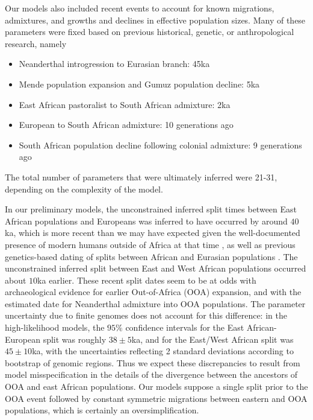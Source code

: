 \documentclass[]{article}
\begin{document}
Our models also included recent events to account for known migrations,
admixtures, and growths and declines in effective population sizes. Many of
these parameters were fixed based on previous historical, genetic, or
anthropological research, namely
\begin{itemize}
    \item Neanderthal introgression to Eurasian branch: 45ka
    \item Mende population expansion and Gumuz population decline: 5ka \citep{Gopalan2022-pw}
    \item East African pastoralist to South African admixture: 2ka \citep{Uren2016-nn}
    \item European to South African admixture: 10 generations ago
    \item South African population decline following colonial admixture: 9 generations ago
\end{itemize}
The total number of parameters that were
ultimately inferred were 21-31, depending on the complexity
of the model.

In our preliminary models, the unconstrained inferred split times between East
African populations and Europeans was inferred to have occurred by around
$40$ka, which is more recent than we may have expected given the
well-documented presence of modern humans outside of Africa at that time
\citep[e.g.]{Hublin2020-nk,Hajdinjak2021-jo}, as well as previous
genetics-based dating of splits between African and Eurasian populations
\citep[e.g.]{Jouganous2017-pq,Kamm2020-vn}. The unconstrained inferred split
between East and West African populations occurred about $10$ka earlier. These
recent split dates seem to be at odds with archaeological evidence for earlier
Out-of-Africa (OOA) expansion, and with the estimated date for Neanderthal
admixture into OOA populations. The parameter uncertainty due to finite genomes
does not account for this difference: in the high-likelihood models, the $95\%$
confidence intervals for the East African-European split was roughly $38 \pm
5$ka, and for the East/West African split was $45 \pm 10$ka, with the
uncertainties reflecting 2 standard deviations according to bootstrap of
genomic regions.  Thus we expect these discrepancies to result from model
misspecification in the details of the divergence between the ancestors of OOA
and east African populations. Our models suppose a single split prior to the
OOA event followed by constant symmetric migrations between eastern and OOA
populations, which is certainly an oversimplification. 
\end{document}
